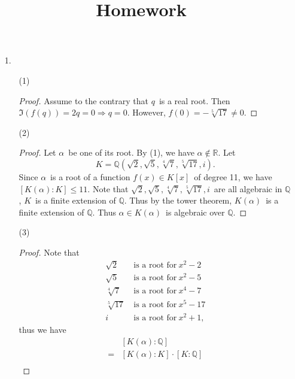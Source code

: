 \documentclass[12pt]{article}
\title{Homework}
\newcommand{\R}{\mathbb{R}}
\newcommand{\Q}{\mathbb{Q}}
\newcommand\Myperm[2][^n]{\prescript{#1\mkern-2.5mu}{}P_{#2}}
\newcommand\Mycomb[2][^n]{\prescript{#1\mkern-0.5mu}{}C_{#2}}
\begin{document}
	




\begin{enumerate}
	\item[1.]
	\begin{enumerate}
		\item[(1)]
		\begin{proof}
			\quad Assume to the contrary that $q$\ is a real root. Then $\Im(f(q))=2q=0\Rightarrow q=0$. However, $f(0)=-\sqrt[5]{17}\neq0$.
		\end{proof}
		\item[(2)]
		\begin{proof}
			\quad Let $\alpha$\ be one of its root. By (1), we have $\alpha\notin\R$. Let
			$$K=\Q(\sqrt{2},\sqrt{5},\sqrt[4]{7},\sqrt[5]{17},i).$$
			Since $\alpha$\ is a root of a function $f(x)\in K[x]$\ of degree 11, we have $[K(\alpha):K]\leq 11$. Note that $\sqrt{2},\sqrt{5},\sqrt[4]{7},\sqrt[5]{17},i$\ are all algebraic in $\Q$, $K$\ is a finite extension of $\Q$. Thus by the tower theorem, $K(\alpha)$\ is a finite extension of $\Q$. Thus $\alpha\in K(\alpha)$\ is algebraic over $\Q$.
		\end{proof}
		\item[(3)]
		\begin{proof}
			\quad Note that
			$$\begin{aligned}
				\sqrt{2}\ &\text{is a root for}\ x^2-2\\
				\sqrt{5}\ &\text{is a root for}\ x^2-5\\
				\sqrt[4]{7}\ &\text{is a root for}\ x^4-7\\
				\sqrt[5]{17}\ &\text{is a root for}\ x^5-17\\
				i\ &\text{is a root for}\ x^2+1,
			\end{aligned}$$
			thus we have
			$$\begin{aligned}
				&[K(\alpha):\Q]\\
				=&[K(\alpha):K]\cdot[K:\Q]\\

\end{aligned}$$
\end{proof}
\end{enumerate}
\end{enumerate}
\end{document}
